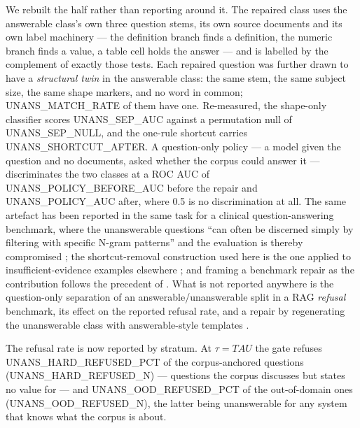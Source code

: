 \documentclass[conference]{IEEEtran}
\begin{document}
We rebuilt the half rather than reporting around it. The repaired class uses
the answerable class's own three question stems, its own source documents and
its own label machinery --- the definition branch finds a definition, the
numeric branch finds a value, a table cell holds the answer --- and is labelled
by the complement of exactly those tests. Each repaired question was further
drawn to have a \emph{structural twin} in the answerable class: the same stem,
the same subject size, the same shape markers, and no word in common;
{{UNANS_MATCH_RATE}} of them have one. Re-measured, the shape-only classifier
scores {{UNANS_SEP_AUC}} against a permutation null of {{UNANS_SEP_NULL}}, and
the one-rule shortcut carries {{UNANS_SHORTCUT_AFTER}}. A question-only policy
--- a model given the question and no documents, asked whether the corpus
could answer it --- discriminates the two classes at a ROC AUC of
{{UNANS_POLICY_BEFORE_AUC}} before the repair and {{UNANS_POLICY_AUC}} after,
where 0.5 is no discrimination at all. The same artefact has been reported in
the same task for a clinical question-answering benchmark, where the
unanswerable questions ``can often be discerned simply by filtering with
specific N-gram patterns'' and the evaluation is thereby compromised
\cite{yang2024ehrsql}; the shortcut-removal construction used here is the one
applied to insufficient-evidence examples elsewhere
\cite{mondal2026beforeanswering}; and framing a benchmark repair as the
contribution follows the precedent of \cite{brunello2026folio}. What is not
reported anywhere is the question-only separation of an answerable/unanswerable
split in a RAG \emph{refusal} benchmark, its effect on the reported refusal
rate, and a repair by regenerating the unanswerable class with answerable-style
templates \cite{gautam2023unanswerable}.

The refusal rate is now reported by stratum. At $\tau = {{TAU}}$ the gate
refuses {{UNANS_HARD_REFUSED_PCT}} of the corpus-anchored questions
({{UNANS_HARD_REFUSED_N}}) --- questions the corpus discusses but states no
value for --- and {{UNANS_OOD_REFUSED_PCT}} of the out-of-domain ones
({{UNANS_OOD_REFUSED_N}}), the latter being unanswerable for any system that
knows what the corpus is about.

\end{document}
